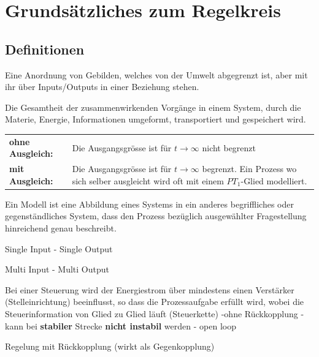 \section{Grundsätzliches zum Regelkreis}
\subsection{Definitionen }


\begin{description}[leftmargin=2.5cm]
 \item[System]	Eine Anordnung von Gebilden, welches von der Umwelt abgegrenzt ist, aber
								mit ihr über Inputs/Outputs in einer Beziehung stehen.
 \item[Prozess] Die Gesamtheit der zusammenwirkenden Vorgänge in einem System,
        		durch die Materie, Energie, Informationen umgeformt, transportiert und
        		gespeichert wird. \\
        		\begin{tabular}{lp{12cm}}
        		\textbf{ohne Ausgleich:} & Die Ausgangsgrösse ist für $t \rightarrow \infty$ nicht begrenzt \\
        		\textbf{mit Ausgleich:} & Die Ausgangsgrösse ist für $t \rightarrow \infty$ begrenzt. Ein Prozess wo sich selber ausgleicht wird oft mit einem $PT_1$-Glied modelliert.
        		\end{tabular}
 \item[Modell]	Ein Modell ist eine Abbildung eines Systems in ein anderes begriffliches oder
								gegenständliches System, dass den Prozess bezüglich ausgewählter Fragestellung
								hinreichend genau beschreibt.
 \item[SISO] Single Input - Single Output
 \item[MIMO] Multi Input - Multi Output
 \item[Steuerung]	Bei einer Steuerung wird der Energiestrom über mindestens einen Verstärker (Stelleinrichtung)
									beeinflusst, so dass die Prozessaufgabe erfüllt wird, wobei die Steuerinformation
									von Glied zu Glied läuft (Steuerkette) \newline
									-ohne Rückkopplung \newline
									- kann bei \textbf{stabiler} Strecke \textbf{nicht instabil} werden \newline
									- open loop\\
\begin{minipage}{8cm}
 \item[Regelung] mit Rückkopplung (wirkt als Gegenkopplung) \newline

\end{minipage}
\end{description}
